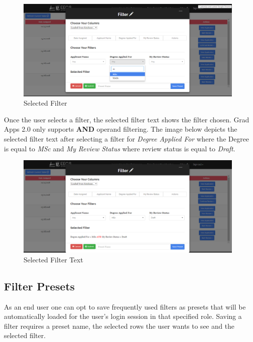 \documentclass[fontsize=12pt,paper=letter,twoside]{scrartcl}
\begin{document}
\clearpage
\begin{figure}[!htb]
\begin{center}
\includegraphics[width=.9\textwidth]{images/selected_filter.png}
\end{center}
\caption{Selected Filter}
\label{fig:fm_selected_filter}
\end{figure}

\bigskip
\noindent Once the user selects a filter, the selected filter text shows the filter chosen. Grad Apps 2.0 only supports \textbf{AND} operand filtering. The image below depicts the selected filter text after selecting a filter for \emph{Degree Applied For} where the Degree is equal to \emph{MSc} and \emph{My Review Status} where review status is equal to \emph{Draft}.

\begin{figure}[!htb]
\begin{center}
\includegraphics[width=.9\textwidth]{images/selected_filter_text.png}
\end{center}
\caption{Selected Filter Text}
\label{fig:fm_selected_filter_txt}
\end{figure}

\subsection{Filter Presets}
As an end user one can opt to save frequently used filters as presets that will be automatically loaded for the user's login session in that specified role. Saving a filter requires a preset name, the selected rows the user wants to see and the selected filter. 
\end{document}
